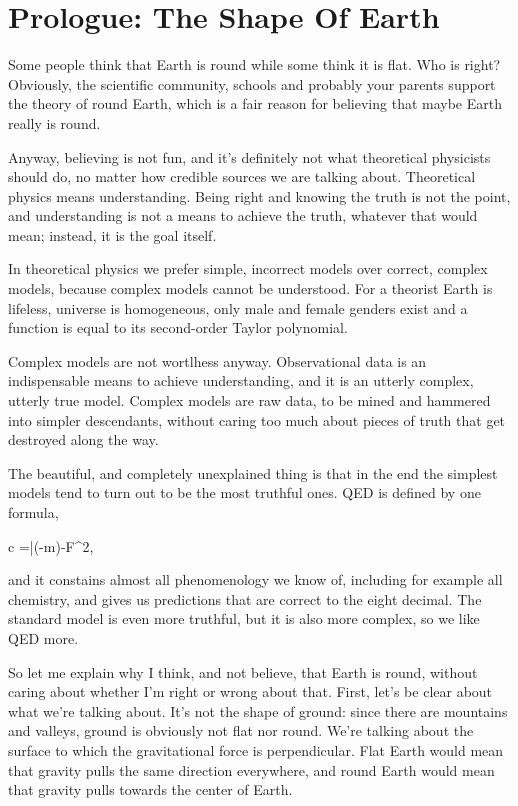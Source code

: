\documentclass[11pt,oneside%
]{memoir}
\newenvironment{eqna}{\begin{IEEEeqnarray*}{c}}{\end{IEEEeqnarray*}\ignorespacesafterend}
\newcommand{\ii}{\mathrm{i}}
\begin{document}
\frontmatter
\tableofcontents
\chapter{Prologue: The Shape Of Earth}

Some people think that Earth is round while some think it is flat. Who is right? Obviously, the scientific community, schools and probably your parents support the theory of round Earth, which is a fair reason for believing that maybe Earth really is round.

Anyway, believing is not fun, and it's definitely not what theoretical physicists should do, no matter how credible sources we are talking about. Theoretical physics means understanding. Being right and knowing the truth is not the point, and understanding is not a means to achieve the truth, whatever that would mean; instead, it is the goal itself.

In theoretical physics we prefer simple, incorrect models over correct, complex models, because complex models cannot be understood. For a theorist Earth is lifeless, universe is homogeneous, only male and female genders exist and a function is equal to its second-order Taylor polynomial. 

Complex models are not wortlhess anyway. Observational data is an indispensable means to achieve understanding, and it is an utterly complex, utterly true model. Complex models are raw data, to be mined and hammered into simpler descendants, without caring too much about pieces of truth that get destroyed along the way.

The beautiful, and completely unexplained thing is that in the end the simplest models tend to turn out to be the most truthful ones. QED is defined by one formula,
\begin{eqna}
=\bar{\psi}(\ii{}-m)\psi-F^2,
\end{eqna}
and it constains almost all phenomenology we know of, including for example all chemistry, and gives us predictions that are correct to the eight decimal. The standard model is even more truthful, but it is also more complex, so we like QED more.

So let me explain why I think, and not believe, that Earth is round, without caring about whether I'm right or wrong about that. First, let's be clear about what we're talking about. It's not the shape of ground: since there are mountains and valleys, ground is obviously not flat nor round. We're talking about the surface to which the gravitational force is perpendicular. Flat Earth would mean that gravity pulls the same direction everywhere, and round Earth would mean that gravity pulls towards the center of Earth.
\end{document}
